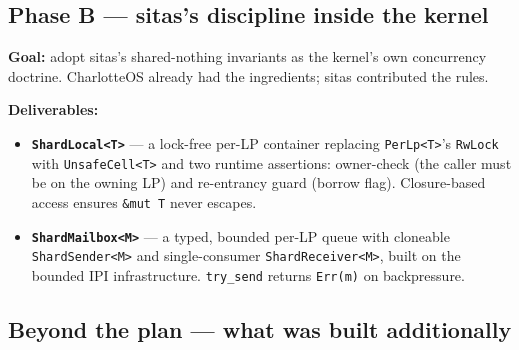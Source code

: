 \subsection{Phase B --- sitas's discipline inside the kernel}

\textbf{Goal:} adopt sitas's shared-nothing invariants as the kernel's own
concurrency doctrine. CharlotteOS already had the ingredients; sitas
contributed the rules.

\textbf{Deliverables:}

\begin{itemize}
    \item \textbf{\texttt{ShardLocal<T>}} --- a lock-free per-LP container
        replacing \texttt{PerLp<T>}'s \texttt{RwLock} with \texttt{UnsafeCell<T>}
        and two runtime assertions: owner-check (the caller must be on the
        owning LP) and re-entrancy guard (borrow flag). Closure-based access
        ensures \texttt{\&mut T} never escapes.
    \item \textbf{\texttt{ShardMailbox<M>}} --- a typed, bounded per-LP queue
        with cloneable \texttt{ShardSender<M>} and single-consumer
        \texttt{ShardReceiver<M>}, built on the bounded IPI infrastructure.
        \texttt{try\_send} returns \texttt{Err(m)} on backpressure.
\end{itemize}

\subsection{Beyond the plan --- what was built additionally}

